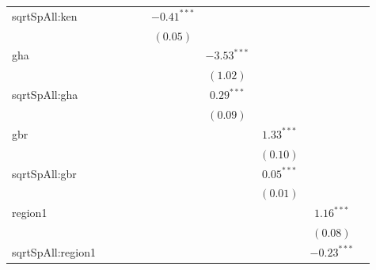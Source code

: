 \begin{sidewaystable}
\begin{center}
{\begin{tabular}{l c c c c c c c c c}
sqrtSpAll:ken     &               &               &               &                 & $-0.41^{***}$  &               &                 &               &               \\
                  &               &               &               &                 & $(0.05)$       &               &                 &               &               \\
gha               &               &               &               &                 &                & $-3.53^{***}$ &                 &               &               \\
                  &               &               &               &                 &                & $(1.02)$      &                 &               &               \\
sqrtSpAll:gha     &               &               &               &                 &                & $0.29^{***}$  &                 &               &               \\
                  &               &               &               &                 &                & $(0.09)$      &                 &               &               \\
gbr               &               &               &               &                 &                &               & $1.33^{***}$    &               &               \\
                  &               &               &               &                 &                &               & $(0.10)$        &               &               \\
sqrtSpAll:gbr     &               &               &               &                 &                &               & $0.05^{***}$    &               &               \\
                  &               &               &               &                 &                &               & $(0.01)$        &               &               \\
region1           &               &               &               &                 &                &               &                 & $1.16^{***}$  &               \\
                  &               &               &               &                 &                &               &                 & $(0.08)$      &               \\
sqrtSpAll:region1 &               &               &               &                 &                &               &                 & $-0.23^{***}$ &               \\

\end{tabular}}
\end{center}
\end{sidewaystable}
